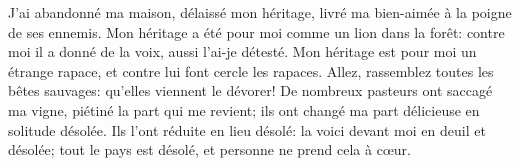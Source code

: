 J’ai abandonné ma maison, délaissé mon héritage,
	livré ma bien-aimée à la poigne de ses ennemis.
Mon héritage a été pour moi comme un lion dans la forêt:
	contre moi il a donné de la voix, aussi l’ai-je détesté.
Mon héritage est pour moi un étrange rapace,
	et contre lui font cercle les rapaces.
	Allez, rassemblez toutes les bêtes sauvages: qu’elles viennent le dévorer!
De nombreux pasteurs ont saccagé ma vigne, piétiné la part qui me revient;
	ils ont changé ma part délicieuse en solitude désolée.
Ils l’ont réduite en lieu désolé:
	la voici devant moi en deuil et désolée;
	tout le pays est désolé, et personne ne prend cela à cœur.
